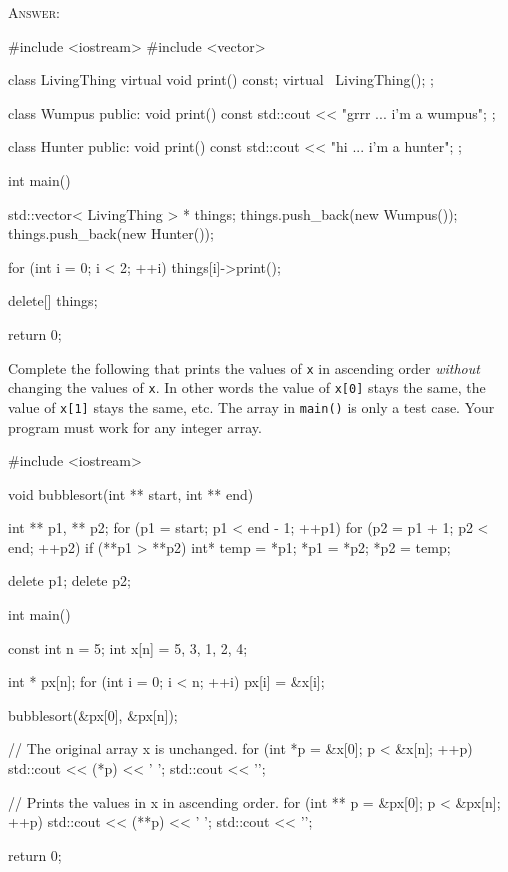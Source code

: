 \textsc{Answer:}
\begin{answercode}
#include <iostream>
#include <vector>

class LivingThing
{
  virtual void print() const;
  virtual ~LivingThing();
};

class Wumpus
{
public:
    void print() const
    {
        std::cout << "grrr ... i'm a wumpus\n";
    }
};

class Hunter
{
public:
    void print() const
    {
        std::cout << "hi ... i'm a hunter\n";
    }
};

int main()
{
    std::vector< LivingThing > * things;
    things.push_back(new Wumpus());
    things.push_back(new Hunter());

    for (int i = 0; i < 2; ++i)
    {
        things[i]->print();
    }

   
    delete[] things;
    
    
    return 0;
}
\end{answercode}

\newpage
\nextq
Complete the following that prints the values of \verb!x! in ascending order
\textit{without} changing the values of \verb!x!.
In other words
the value of \verb!x[0]! stays the same,
the value of \verb!x[1]! stays the same, etc.
The array in \verb!main()! is only a test case.
Your program must work for any integer array.

\begin{answercode}
#include <iostream>

void bubblesort(int ** start, int ** end)
{
  int ** p1, ** p2;
  for (p1 = start; p1 < end - 1; ++p1)
  {
    for (p2 = p1 + 1; p2 < end; ++p2)
    {
      if (**p1 > **p2)
      {
        int* temp = *p1;
        *p1 = *p2;
        *p2 = temp;
      }
    }
  }
  
  delete p1;
  delete p2;
}

int main()
{
    const int n = 5;            
    int x[n] = {5, 3, 1, 2, 4};
    
    int * px[n];
    for (int i = 0; i < n; ++i)
    {
        px[i] = &x[i];
    }

    bubblesort(&px[0], &px[n]);
    
    // The original array x is unchanged.
    for (int *p = &x[0]; p < &x[n]; ++p)
    {
        std::cout << (*p) << ' ';
    }
    std::cout << '\n';

    // Prints the values in x in ascending order.
    for (int ** p = &px[0]; p < &px[n]; ++p)
    {
        std::cout << (**p) << ' ';
    }
    std::cout << '\n';
    
    return 0;
}
\end{answercode}

\newpage


